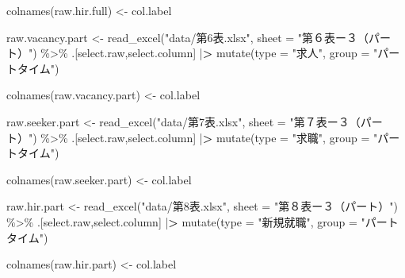 \documentclass[
]{book}
\newenvironment{Shaded}{\begin{snugshade}}{\end{snugshade}}
\newcommand{\AttributeTok}[1]{\textcolor[rgb]{0.77,0.63,0.00}{#1}}
\newcommand{\ErrorTok}[1]{\textcolor[rgb]{0.64,0.00,0.00}{\textbf{#1}}}
\newcommand{\FunctionTok}[1]{\textcolor[rgb]{0.00,0.00,0.00}{#1}}
\newcommand{\NormalTok}[1]{#1}
\newcommand{\OtherTok}[1]{\textcolor[rgb]{0.56,0.35,0.01}{#1}}
\newcommand{\SpecialCharTok}[1]{\textcolor[rgb]{0.00,0.00,0.00}{#1}}
\newcommand{\StringTok}[1]{\textcolor[rgb]{0.31,0.60,0.02}{#1}}
\begin{document}
\begin{Shaded}
\begin{Highlighting}[]
\FunctionTok{colnames}\NormalTok{(raw.hir.full) }\OtherTok{\textless{}{-}}\NormalTok{ col.label}


\NormalTok{raw.vacancy.part }\OtherTok{\textless{}{-}}
  \FunctionTok{read\_excel}\NormalTok{(}\StringTok{"data/第6表.xlsx"}\NormalTok{,}
             \AttributeTok{sheet =} \StringTok{"第６表ー３（パート）"}\NormalTok{) }\SpecialCharTok{\%\textgreater{}\%}
\NormalTok{  .[select.raw,select.column] }\SpecialCharTok{|}\ErrorTok{\textgreater{}} 
  \FunctionTok{mutate}\NormalTok{(}\AttributeTok{type =} \StringTok{"求人"}\NormalTok{,}
         \AttributeTok{group =} \StringTok{"パートタイム"}\NormalTok{)}

\FunctionTok{colnames}\NormalTok{(raw.vacancy.part) }\OtherTok{\textless{}{-}}\NormalTok{ col.label}

\NormalTok{raw.seeker.part }\OtherTok{\textless{}{-}}
  \FunctionTok{read\_excel}\NormalTok{(}\StringTok{"data/第7表.xlsx"}\NormalTok{,}
             \AttributeTok{sheet =} \StringTok{"第７表ー３（パート）"}\NormalTok{)  }\SpecialCharTok{\%\textgreater{}\%}
\NormalTok{  .[select.raw,select.column] }\SpecialCharTok{|}\ErrorTok{\textgreater{}} 
  \FunctionTok{mutate}\NormalTok{(}\AttributeTok{type =} \StringTok{"求職"}\NormalTok{,}
         \AttributeTok{group =} \StringTok{"パートタイム"}\NormalTok{)}

\FunctionTok{colnames}\NormalTok{(raw.seeker.part) }\OtherTok{\textless{}{-}}\NormalTok{ col.label}

\NormalTok{raw.hir.part }\OtherTok{\textless{}{-}}
  \FunctionTok{read\_excel}\NormalTok{(}\StringTok{"data/第8表.xlsx"}\NormalTok{,}
             \AttributeTok{sheet =} \StringTok{"第８表ー３（パート）"}\NormalTok{) }\SpecialCharTok{\%\textgreater{}\%}
\NormalTok{  .[select.raw,select.column] }\SpecialCharTok{|}\ErrorTok{\textgreater{}} 
  \FunctionTok{mutate}\NormalTok{(}\AttributeTok{type =} \StringTok{"新規就職"}\NormalTok{,}
         \AttributeTok{group =} \StringTok{"パートタイム"}\NormalTok{)}

\FunctionTok{colnames}\NormalTok{(raw.hir.part) }\OtherTok{\textless{}{-}}\NormalTok{ col.label}


\end{Highlighting}
\end{Shaded}
\end{document}
